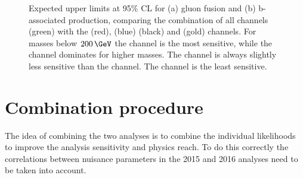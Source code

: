 \begin{figure}[h!]
\begin{center}
\end{center}
\caption[Expected upper limits at 95\% CL for the gluon fusion and b-associated
production, comparing the combination of all channels with the per-channel limits.]{Expected upper limits at 95\% \ac{CL} for (a) gluon fusion and (b) b-associated production,
comparing the combination of all channels (green) with the \mutau (red), \etau (blue) \tautau (black)
and \emu (gold) channels. For masses below $200\,\GeV$ the \mutau channel is the most sensitive,
while the \tautau channel dominates for higher masses. The \etau channel is always
slightly less sensitive than the \mutau channel. The \emu channel is the least sensitive.}
\label{fig:mssm_results_limits_breakdown_hig16006}
\end{figure}
\clearpage


\section{Combination procedure}
\label{sec:mssm_combination_procedure}
The idea of combining the two analyses is to combine the 
individual likelihoods to improve the analysis sensitivity and
physics reach. To do this correctly the correlations between
nuisance parameters in the 2015 and 2016 analyses need to be taken into account.

